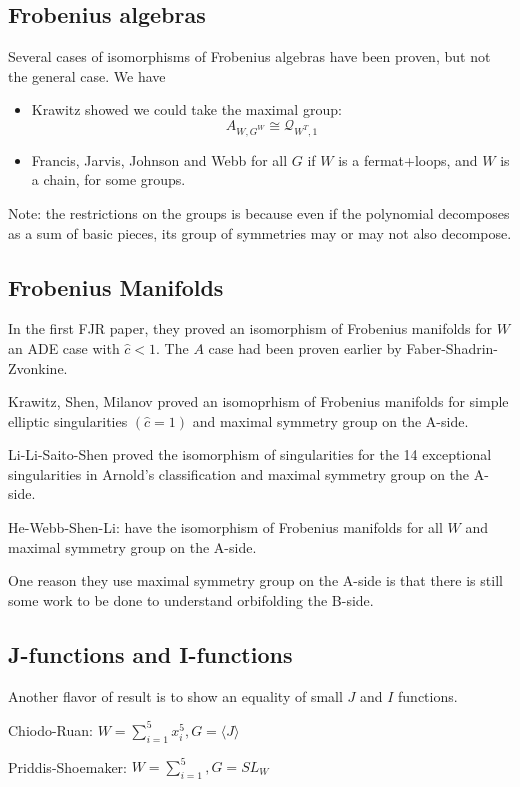 \documentclass{amsart}
\theoremstyle{definition}
\newcommand{\one}{1}
\begin{document}
\subsection{Frobenius algebras}

Several cases of isomorphisms of Frobenius algebras have been proven, but not the general case.  We have
\begin{itemize}
\item Krawitz showed we could take the maximal group:
$$A_{W,G^W}\cong\mathcal{Q}_{W^T,\one}$$
\item Francis, Jarvis, Johnson and Webb for all $G$ if $W$ is a fermat+loops, and $W$ is a chain, for some groups.
\end{itemize}

Note: the restrictions on the groups is because even if the polynomial decomposes as a sum of basic pieces, its group of symmetries may or may not also decompose.

\subsection{Frobenius Manifolds}
In the first FJR paper, they proved an isomorphism of Frobenius manifolds for $W$ an ADE case with $\hat{c}<1$.  The $A$ case had been proven earlier by Faber-Shadrin-Zvonkine.

Krawitz, Shen, Milanov proved an isomoprhism of Frobenius manifolds for simple elliptic singularities $(\hat{c}=1)$ and maximal symmetry group on the A-side.

Li-Li-Saito-Shen proved the isomorphism of singularities for the 14 exceptional singularities in Arnold's classification and maximal symmetry group on the A-side.

He-Webb-Shen-Li: have the isomorphism of Frobenius manifolds for all $W$ and maximal symmetry group on the A-side.

One reason they use maximal symmetry group on the A-side is that there is still some work to be done to understand orbifolding the B-side.

\subsection{J-functions and I-functions}
Another flavor of result is to show an equality of small $J$ and $I$ functions.


Chiodo-Ruan: $W=\sum_{i=1}^5 x_i^5, G=\langle J\rangle$

Priddis-Shoemaker: $W=\sum_{i=1}^5, G=SL_W$
\end{document}
